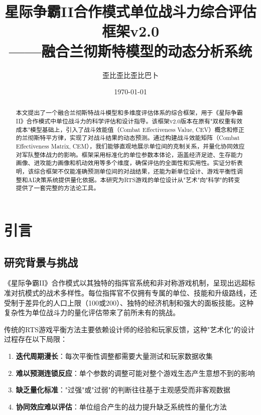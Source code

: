 \documentclass[a4paper,12pt]{article}
\title{\textbf{星际争霸II合作模式单位战斗力综合评估框架v2.0\\——融合兰彻斯特模型的动态分析系统}}
\author{歪比歪比歪比巴卜}
\date{\today}
\begin{document}
\maketitle

\begin{abstract}
\noindent
本文提出了一个融合兰彻斯特战斗模型和多维度评估体系的综合框架，用于《星际争霸II》合作模式中单位战斗力的科学评估和设计指导。该框架v2.0版本在原有"双权重有效成本"模型基础上，引入了战斗效能值（Combat Effectiveness Value, CEV）概念和修正的兰彻斯特平方律，实现了对战斗结果的动态预测。通过构建战斗效能矩阵（Combat Effectiveness Matrix, CEM），我们能够直观地展示单位间的克制关系，并量化协同效应对军队整体战力的影响。框架采用标准化的单位参数本体论，涵盖经济足迹、生存能力画像、进攻能力画像和机动效用等多个维度，确保评估的全面性和实用性。实证分析表明，该综合框架不仅能准确预测单位间的对战结果，还能为新单位设计、游戏平衡性调整和AI决策系统提供量化依据。本研究为RTS游戏的单位设计从"艺术"向"科学"的转变提供了一套完整的方法论工具。
\end{abstract}

\tableofcontents
\newpage

\section{引言}

\subsection{研究背景与挑战}
《星际争霸II》合作模式以其独特的指挥官系统和非对称游戏机制，呈现出远超标准对抗模式的战术多样性。每位指挥官不仅拥有专属的单位、技能和升级路线，还受制于差异化的人口上限（100或200）、独特的经济机制和强大的面板技能。这种复杂性为单位战斗力的量化评估带来了前所未有的挑战。

传统的RTS游戏平衡方法主要依赖设计师的经验和玩家反馈，这种"艺术化"的设计过程存在以下局限：
\begin{enumerate}
\item \textbf{迭代周期漫长}：每次平衡性调整都需要大量测试和玩家数据收集
\item \textbf{难以预测连锁反应}：单个参数的调整可能对整个游戏生态产生意想不到的影响
\item \textbf{缺乏量化标准}："过强"或"过弱"的判断往往基于主观感受而非客观数据
\item \textbf{协同效应难以评估}：单位组合产生的战力提升缺乏系统性的量化方法
\end{enumerate}
\end{document}

